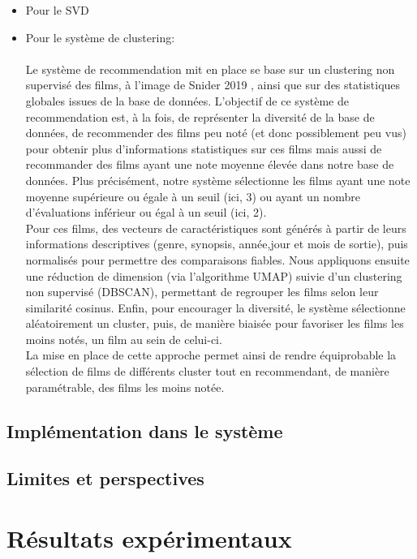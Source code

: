 \documentclass{article}
\begin{document}
\begin{itemize}
    \item Pour le SVD
    \item Pour le système de clustering:\\
    $ $\\
    Le système de recommendation mit en place se base sur un clustering non supervisé des films, à l'image de Snider 2019 \cite{snider_unsupervised} , ainsi que sur des statistiques globales issues de la base de données.
    L'objectif de ce système de recommendation est, à la fois, de représenter la diversité de la base de données, de recommender des films peu noté (et donc possiblement 
    peu vus) pour obtenir plus d'informations statistiques sur ces films mais aussi de recommander des films ayant une note moyenne élevée dans notre base de données.
    Plus précisément, notre système sélectionne les films ayant une note moyenne supérieure ou égale à un seuil (ici, 3)  ou ayant un nombre d’évaluations inférieur ou égal à un seuil (ici, 2).\\
    Pour ces films, des vecteurs de caractéristiques sont générés à partir de leurs informations descriptives (genre, synopsis, année,jour et mois de sortie), 
    puis normalisés pour permettre des comparaisons fiables. Nous appliquons ensuite une réduction de dimension (via l’algorithme UMAP) suivie d’un clustering 
    non supervisé (DBSCAN), permettant de regrouper les films selon leur similarité cosinus. Enfin, pour encourager la diversité, le système sélectionne aléatoirement un cluster, puis, de 
    manière biaisée pour favoriser les films les moins notés, un film au sein de celui-ci.\\
    La mise en place de cette approche permet ainsi de rendre équiprobable la sélection de films de différents cluster tout en recommendant, de manière paramétrable, des films les moins notée.
\end{itemize}




    \subsection{Implémentation dans le système}
    \subsection{Limites et perspectives}


    \section{Résultats expérimentaux}
\end{document}
